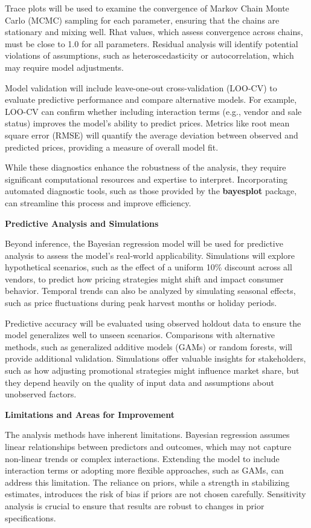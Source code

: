 \documentclass[
  letterpaper,
  DIV=11,
  numbers=noendperiod]{scrartcl}
\begin{document}
Trace plots will be used to examine the convergence of Markov Chain
Monte Carlo (MCMC) sampling for each parameter, ensuring that the chains
are stationary and mixing well. Rhat values, which assess convergence
across chains, must be close to 1.0 for all parameters. Residual
analysis will identify potential violations of assumptions, such as
heteroscedasticity or autocorrelation, which may require model
adjustments.

Model validation will include leave-one-out cross-validation (LOO-CV) to
evaluate predictive performance and compare alternative models. For
example, LOO-CV can confirm whether including interaction terms (e.g.,
vendor and sale status) improves the model's ability to predict prices.
Metrics like root mean square error (RMSE) will quantify the average
deviation between observed and predicted prices, providing a measure of
overall model fit.

While these diagnostics enhance the robustness of the analysis, they
require significant computational resources and expertise to interpret.
Incorporating automated diagnostic tools, such as those provided by the
\textbf{bayesplot} package, can streamline this process and improve
efficiency.

\textbf{Predictive Analysis and Simulations}

Beyond inference, the Bayesian regression model will be used for
predictive analysis to assess the model's real-world applicability.
Simulations will explore hypothetical scenarios, such as the effect of a
uniform 10\% discount across all vendors, to predict how pricing
strategies might shift and impact consumer behavior. Temporal trends can
also be analyzed by simulating seasonal effects, such as price
fluctuations during peak harvest months or holiday periods.

Predictive accuracy will be evaluated using observed holdout data to
ensure the model generalizes well to unseen scenarios. Comparisons with
alternative methods, such as generalized additive models (GAMs) or
random forests, will provide additional validation. Simulations offer
valuable insights for stakeholders, such as how adjusting promotional
strategies might influence market share, but they depend heavily on the
quality of input data and assumptions about unobserved factors.

\textbf{Limitations and Areas for Improvement}

The analysis methods have inherent limitations. Bayesian regression
assumes linear relationships between predictors and outcomes, which may
not capture non-linear trends or complex interactions. Extending the
model to include interaction terms or adopting more flexible approaches,
such as GAMs, can address this limitation. The reliance on priors, while
a strength in stabilizing estimates, introduces the risk of bias if
priors are not chosen carefully. Sensitivity analysis is crucial to
ensure that results are robust to changes in prior specifications.
\end{document}
